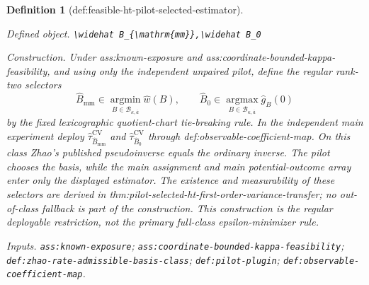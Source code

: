 \documentclass{article}
\newtheorem{definition}{Definition}
\begin{document}
\begin{definition}[def:feasible-ht-pilot-selected-estimator]\label{def:feasible-ht-pilot-selected-estimator}
\par\smallskip\noindent\emph{Defined object.} \texttt{\textbackslash{}\allowbreak{}widehat B\_\allowbreak{}\{\textbackslash{}\allowbreak{}mathrm\{mm\}\allowbreak{}\}\allowbreak{},\allowbreak{}\textbackslash{}\allowbreak{}widehat B\_\allowbreak{}0}
\par\smallskip\noindent\emph{Construction.} Under ass:known-exposure and ass:coordinate-bounded-kappa-feasibility, and using only the independent unpaired pilot, define the regular rank-two selectors
\[
\widehat B_{\mathrm{mm}}
\in\operatorname*{argmin}_{B\in\mathcal B_{\kappa,\overline a}}\widehat w(B),
\qquad
\widehat B_0
\in\operatorname*{argmax}_{B\in\mathcal B_{\kappa,\overline a}}\widehat g_B(0)
\]
by the fixed lexicographic quotient-chart tie-breaking rule.  In the independent main experiment deploy \(\widehat\tau_{\widehat B_{\mathrm{mm}}}^{\mathrm{CV}}\) and \(\widehat\tau_{\widehat B_0}^{\mathrm{CV}}\) through def:observable-coefficient-map.  On this class Zhao's published pseudoinverse equals the ordinary inverse.  The pilot chooses the basis, while the main assignment and main potential-outcome array enter only the displayed estimator.  The existence and measurability of these selectors are derived in thm:pilot-selected-ht-first-order-variance-transfer; no out-of-class fallback is part of the construction.  This construction is the regular deployable restriction, not the primary full-class epsilon-minimizer rule.
\par\smallskip\noindent\emph{Inputs.} \texttt{ass:\allowbreak{}known-\allowbreak{}exposure}; \texttt{ass:\allowbreak{}coordinate-\allowbreak{}bounded-\allowbreak{}kappa-\allowbreak{}feasibility}; \texttt{def:\allowbreak{}zhao-\allowbreak{}rate-\allowbreak{}admissible-\allowbreak{}basis-\allowbreak{}class}; \texttt{def:\allowbreak{}pilot-\allowbreak{}plugin}; \texttt{def:\allowbreak{}observable-\allowbreak{}coefficient-\allowbreak{}map}.
\end{definition}
\end{document}
